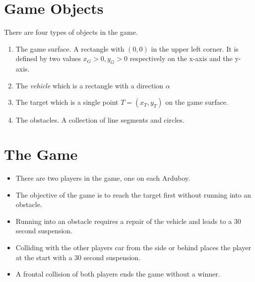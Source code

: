 \documentclass[11pt]{article}
\begin{document}
\section{Game Objects}
\label{sec-game-objects}
There are four types of objects in the game.
\begin{enumerate}
    \item The game surface. A rectangle with $(0,0)$ in the upper left corner.
        It is defined by two values $x_G > 0, y_G>0$ respectively on the x-axis
        and the y-axis.
    \item The {\sl vehicle} which is a rectangle with a direction $\alpha$
    \item The target which is a single point $T = (x_T, y_T)$ on the game
        surface.
    \item The obstacles. A collection of line segments and circles.
\end{enumerate}

\section{The Game}
\label{sec-the-game}
\begin{itemize}
    \item There are two players in the game, one on each Arduboy.
    \item The objective of the game is to reach the target first without
        running into an obstacle.
    \item Running into an obstacle requires a repair of the vehicle and leads
        to a 30 second suspension.
    \item Colliding with the other players car from the side or behind places
        the player at the start with a 30 second suspension.
    \item A frontal collision of both players ends the game without a winner.
\end{itemize}
\end{document}
